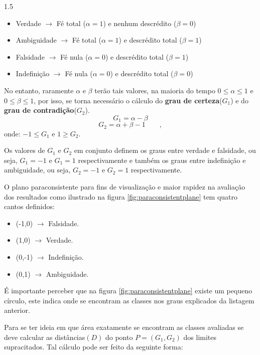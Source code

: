 \documentclass[a4paper,12pt,openright,oneside]{book}
\newenvironment{myenv}[1]
  {\begin{spacing}{#1}}
  {\end{spacing}}
\begin{document}
\begin{myenv}{1.5}
						\begin{itemize}
							\item Verdade $\rightarrow$ Fé total ($\alpha = 1$) e nenhum descrédito ($\beta = 0$)
							\item Ambiguidade $\rightarrow$ Fé total ($\alpha = 1$) e descrédito total ($\beta = 1$)
							\item Falsidade $\rightarrow$ Fé nula ($\alpha = 0$) e descrédito total ($\beta = 1$)
							\item Indefinição $\rightarrow$ Fé nula ($\alpha = 0$) e descrédito total ($\beta = 0$)
						\end{itemize}
						
						\par No entanto, raramente $\alpha$ e $\beta$ terão tais valores, na maioria do tempo $0 \leqslant \alpha \leqslant 1$ e $0 \leqslant \beta \leqslant 1$, por isso, se torna necessário o cálculo do \textbf{grau de certeza}($G_1$) e do \textbf{grau de contradição}($G_2$).
						\begin{equation}
							G_1=\alpha-\beta 
						\end{equation}
						\begin{equation}
							G_2=\alpha+\beta-1 \qquad,
						\end{equation}
					onde: $-1 \leqslant G_1$ e  $1 \geqslant G_2$.

					\par Os valores de $G_1$ e $G_2$ em conjunto definem os graus entre verdade e falsidade, ou seja, $G_1=-1$ e $G_1=1$ respectivamente e também os graus entre indefinição e ambiguidade, ou seja, $G_2=-1$ e $G_2=1$ respectivamente.
					\par O plano paraconsistente para fins de visualização e maior rapidez na avaliação dos resultados como ilustrado na figura \ref{fig:paraconsistentplane} tem quatro cantos definidos:
					\begin{itemize}
						\item (-1,0) $\rightarrow$ Falsidade.
						\item (1,0) $\rightarrow$ Verdade.
						\item (0,-1) $\rightarrow$ Indefinição.
						\item (0,1) $\rightarrow$ Ambiguidade.
					\end{itemize}
					\par É importante perceber que na figura \ref{fig:paraconsistentplane} existe um pequeno círculo, este indica onde se encontram as classes nos graus explicados da listagem anterior.
					\par Para se ter ideia em que área exatamente se encontram as classes avaliadas se deve calcular as distâncias$(D)$ do ponto $P=(G_1,G_2)$ dos limites supracitados. Tal cálculo pode ser feito da seguinte forma:


\end{myenv}
\end{document}
